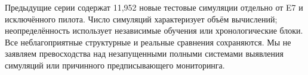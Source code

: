 \documentclass[runningheads]{llncs}
\begin{document}
Предыдущие серии содержат 11,952 новые тестовые симуляции отдельно от E7 и исключённого пилота. Число симуляций характеризует объём вычислений; неопределённость использует независимые обучения или хронологические блоки. Все неблагоприятные структурные и реальные сравнения сохраняются. Мы не заявляем превосходства над незапущенными полными системами выявления симуляций или причинного предписывающего мониторинга.



\label{maintextend}


\end{document}
